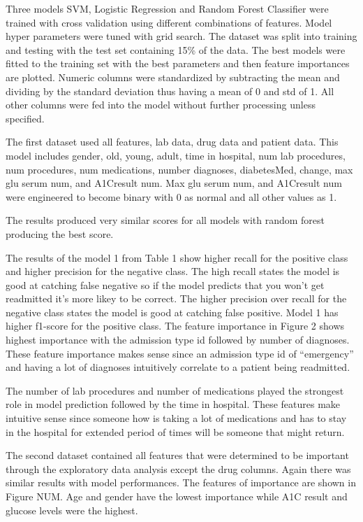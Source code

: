 \documentclass[5p]{elsarticle} %
\begin{document}
Three models SVM, Logistic Regression and Random Forest Classifier were
trained with cross validation using different combinations of features.
Model hyper parameters were tuned with grid search. The dataset was
split into training and testing with the test set containing 15\% of the
data. The best models were fitted to the training set with the best
parameters and then feature importances are plotted. Numeric columns
were standardized by subtracting the mean and dividing by the standard
deviation thus having a mean of 0 and std of 1. All other columns were
fed into the model without further processing unless specified.

The first dataset used all features, lab data, drug data and patient
data. This model includes gender, old, young, adult, time in hospital,
num lab procedures, num procedures, num medications, number diagnoses,
diabetesMed, change, max glu serum num, and A1Cresult num. Max glu serum
num, and A1Cresult num were engineered to become binary with 0 as normal
and all other values as 1.

The results produced very similar scores for all models with random
forest producing the best score.

The results of the model 1 from Table 1 show higher recall for the
positive class and higher precision for the negative class. The high
recall states the model is good at catching false negative so if the
model predicts that you won't get readmitted it's more likey to be
correct. The higher precision over recall for the negative class states
the model is good at catching false positive. Model 1 has higher
f1-score for the positive class. The feature importance in Figure 2
shows highest importance with the admission type id followed by number
of diagnoses. These feature importance makes sense since an admission
type id of ``emergency'' and having a lot of diagnoses intuitively
correlate to a patient being readmitted.

The number of lab procedures and number of medications played the
strongest role in model prediction followed by the time in hospital.
These features make intuitive sense since someone how is taking a lot of
medications and has to stay in the hospital for extended period of times
will be someone that might return.

The second dataset contained all features that were determined to be
important through the exploratory data analysis except the drug columns.
Again there was similar results with model performances. The features of
importance are shown in Figure NUM. Age and gender have the lowest
importance while A1C result and glucose levels were the highest.
\end{document}
